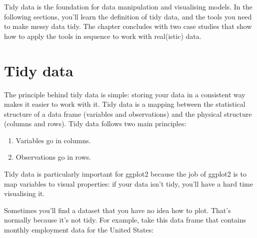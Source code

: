 Tidy data is the foundation for data manipulation and visualising
models. In the following sections, you'll learn the definition of tidy
data, and the tools you need to make messy data tidy. The chapter
concludes with two case studies that show how to apply the tools in
sequence to work with real(istic) data.

\section{Tidy data}\label{sec:tidy-data}

The principle behind tidy data is simple: storing your data in a
consistent way makes it easier to work with it. Tidy data is a mapping
between the statistical structure of a data frame (variables and
observations) and the physical structure (columns and rows). Tidy data
follows two main principles: 

\begin{enumerate}
\def\labelenumi{\arabic{enumi}.}
\tightlist
\item
  Variables go in columns.
\item
  Observations go in rows.
\end{enumerate}

Tidy data is particularly important for ggplot2 because the job of
ggplot2 is to map variables to visual properties: if your data isn't
tidy, you'll have a hard time visualising it.

Sometimes you'll find a dataset that you have no idea how to plot.
That's normally because it's not tidy. For example, take this data frame
that contains monthly employment data for the United States:

\begin{Shaded}
\begin{Highlighting}[]
\CommentTok{#> }
\end{Highlighting}
\end{Shaded}

